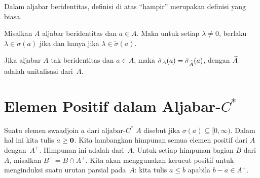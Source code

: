 Dalam aljabar beridentitas, definisi di atas ``hampir'' merupakan definisi yang biasa.
\begin{prop} Misalkan $A$ aljabar beridentitas dan $a \in A$. Maka untuk setiap $\lambda \ne 0$, berlaku
$\lambda \in \sigma(a)$ jika dan hanya jika $\lambda \in \breve{\sigma}(a)$.
\end{prop}

\begin{prop} Jika aljabar $A$ tak beridentitas dan $a \in A$, maka $\breve{\sigma}_A(a) =
\breve{\sigma}_{\widetilde{A}}(a)$, dengan $\widetilde{A}$ adalah unitalisasi dari~$A$.
\end{prop}























\section{Elemen Positif dalam Aljabar-$C^*$}
\begin{defn} Suatu elemen swaadjoin $a$ dari aljabar-$C^*$ $A$ disebut
 jika $\sigma(a) \subseteq [0,\infty)$. Dalam hal ini kita tulis $a \ge \mathbf{0}$.
Kita lambangkan himpunan semua elemen positif dari $A$
dengan~$A^+$. Himpunan ini adalah
 dari~$A$. Untuk setiap himpunan bagian $B$ dari $A$, misalkan $B^+ = B \cap A^+$. Kita akan
menggunakan kerucut positif untuk menginduksi suatu urutan parsial pada~$A$: kita tulis
$a \le b$ apabila $b - a \in A^+$.
\end{defn}

